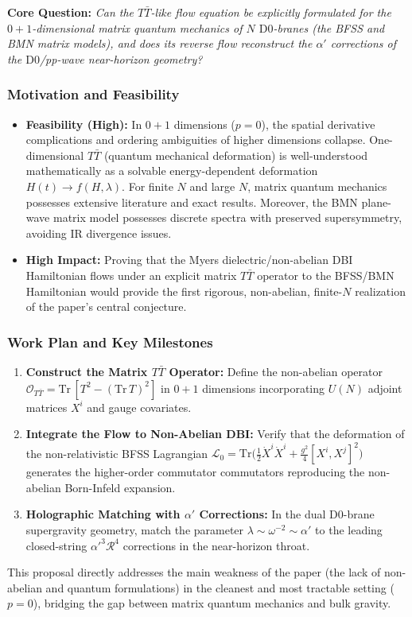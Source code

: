 \documentclass[11pt,a4paper]{article}
\begin{document}
\textbf{Core Question:} \emph{Can the $T\bar{T}$-like flow equation be explicitly formulated for the $0+1$-dimensional matrix quantum mechanics of $N$ $\text{D}0$-branes (the BFSS and BMN matrix models), and does its reverse flow reconstruct the $\alpha'$ corrections of the $\text{D}0$/pp-wave near-horizon geometry?}

\subsubsection{Motivation and Feasibility}
\begin{itemize}
    \item \textbf{Feasibility (High):} In $0+1$ dimensions ($p=0$), the spatial derivative complications and ordering ambiguities of higher dimensions collapse. One-dimensional $T\bar{T}$ (quantum mechanical deformation) is well-understood mathematically as a solvable energy-dependent deformation $H(t) \to f(H, \lambda)$. For finite $N$ and large $N$, matrix quantum mechanics possesses extensive literature and exact results. Moreover, the BMN plane-wave matrix model possesses discrete spectra with preserved supersymmetry, avoiding IR divergence issues.
    \item \textbf{High Impact:} Proving that the Myers dielectric/non-abelian DBI Hamiltonian flows under an explicit matrix $T\bar{T}$ operator to the BFSS/BMN Hamiltonian would provide the first rigorous, non-abelian, finite-$N$ realization of the paper's central conjecture.
\end{itemize}

\subsubsection{Work Plan and Key Milestones}
\begin{enumerate}
    \item \textbf{Construct the Matrix $T\bar{T}$ Operator:} Define the non-abelian operator $\mathcal{O}_{T\bar{T}} = \text{Tr}\,[T^2 - (\text{Tr}\,T)^2]$ in $0+1$ dimensions incorporating $U(N)$ adjoint matrices $X^i$ and gauge covariates.
    \item \textbf{Integrate the Flow to Non-Abelian DBI:} Verify that the deformation of the non-relativistic BFSS Lagrangian $\mathcal{L}_0 = \text{Tr}\big(\frac{1}{2}\dot{X}^i \dot{X}^i + \frac{g^2}{4}[X^i, X^j]^2\big)$ generates the higher-order commutator commutators reproducing the non-abelian Born-Infeld expansion.
    \item \textbf{Holographic Matching with $\alpha'$ Corrections:} In the dual $\text{D}0$-brane supergravity geometry, match the parameter $\lambda \sim \omega^{-2} \sim \alpha'$ to the leading closed-string $\alpha'^3 \mathcal{R}^4$ corrections in the near-horizon throat.
\end{enumerate}

This proposal directly addresses the main weakness of the paper (the lack of non-abelian and quantum formulations) in the cleanest and most tractable setting ($p=0$), bridging the gap between matrix quantum mechanics and bulk gravity.
\end{document}
